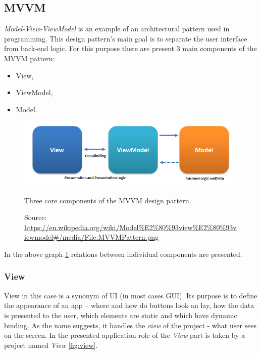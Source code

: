 \subsection{MVVM}
    \textit{Model-View-ViewModel} is an example of an architectural pattern used in programming. This design pattern's main goal is to separate the user interface from back-end logic. For this purpose there are present 3 main components of the MVVM pattern:
    \begin{itemize}
        \item View,
        \item ViewModel,
        \item Model.
    \end{itemize}
    
    \begin{figure}[H]
        \centering
        \includegraphics[width=\textwidth]{img/MVVMPattern.png}
        \caption{Three core components of the MVVM design pattern.}
        \label{fig:mvvm_pattern}
        \caption*{Source: \url{https://en.wikipedia.org/wiki/Model\%E2\%80\%93view\%E2\%80\%93viewmodel\#/media/File:MVVMPattern.png}}
    \end{figure}
    
    In the above graph \ref{fig:mvvm_pattern} relations between individual components are presented.
    
    \subsubsection{View}
        View in this case is a synonym of UI (in most cases GUI). Its purpose is to define the appearance of an app -- where and how do buttons look an lay, how the data is presented to the user, which elements are static and which have dynamic binding. As the name suggests, it handles the \textit{view} of the project - what user sees on the screen.
        In the presented application role of the \textit{View} part is taken by a project named \textit{View} \ref{fig:view}.
        
